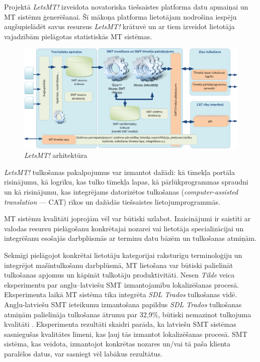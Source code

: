 \begin{multicols}{2}
Projektā \textit{LetsMT!} \cite{Meta34} izveidota novatoriska tiešsaistes platforma datu apmaiņai un MT sistēmu ģenerēšanai.
Šī mākoņa platforma lietotājam nodrošina iespēju augšupielādēt savus resursus \textit{LetsMT!} krātuvē un ar tiem izveidot lietotāja vajadzībām pielāgotas statistiskās MT sistēmas. 

\begin{figure}[htb]
  \center
  \includegraphics[width=\textwidth]{../_media/latvian/LetsMT_architecture_LV}
  \caption{\textit{LetsMT!} arhitektūra}
  \label{fig:LetsMT_architecture_LV}
\end{figure}

\textit{LetsMT!} tulkošanas pakalpojumus var izmantot dažādi: kā tīmekļa portāla risinājumu, kā logrīku, kas tulko tīmekļa lapas, kā pārlūkprogrammas spraudni un kā risinājumu, kas integrējams datorizētos tulkošanas (\textit{computer-assisted translation} — CAT) rīkos un dažādās tiešsaistes lietojumprogrammās. 

MT sistēmu kvalitāti joprojām vēl var būtiski uzlabot.
Izaicinājumi ir saistīti ar valodas resursu pielāgošanu konkrētajai nozarei vai lietotāja specializācijai un integrēšanu esošajās darbplūsmās ar terminu datu bāzēm un tulkošanas atmiņām. 

Sekmīgi pielāgojot konkrētai lietotāju kategorijai raksturīgu terminoloģiju un integrējot mašīntulkošanu darbplūsmā, MT lietošana var būtiski palielināt tulkošanas apjomus un kāpināt tulkotāju produktivitāti.
Nesen \textit{Tilde} veica eksperimentu par angļu--latviešu SMT izmantojamību lokalizēšanas procesā.
Eksperimenta laikā MT sistēma tika integrēta \textit{SDL Trados} tulkošanas vidē.
Angļu-latviešu SMT ieteikumu izmantošana papildus \textit{SDL Trados} tulkošanas atmiņām palielināja tulkošanas ātrumu par 32,9\%, būtiski nemazinot tulkojuma kvalitāti \cite{Meta35}.
Eksperimenta rezultāti skaidri parāda, ka latviešu SMT sistēmas sasniegušas kvalitātes līmeni, kas ļauj tās izmantot lokalizēšanas procesā. 
SMT sistēma, kas veidota, izmantojot konkrētas nozares un/vai tā paša klienta paralēlos datus, var sasniegt vēl labākus rezultātus.


\end{multicols}
